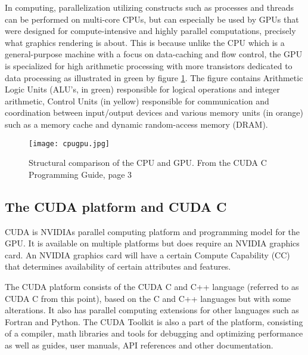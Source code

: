 In computing, parallelization utilizing constructs such as processes and threads can be performed on multi-core CPUs, but can especially be used by GPUs that were designed for compute-intensive and highly parallel computations, precisely what graphics rendering is about.
This is because unlike the CPU which is a general-purpose machine with a focus on data-caching and flow control, the GPU is specialized for high arithmetic processing with more transistors dedicated to data processing as illustrated in green by figure \ref{cpugpu}. 
The figure contains Arithmetic Logic Units (ALU's, in green) responsible for logical operations and integer arithmetic, Control Units (in yellow) responsible for communication and coordination between input/output devices and various memory units (in orange) such as a memory cache and dynamic random-access memory (DRAM).

\begin{figure}[h!]
\texttt{[image: cpugpu.jpg]}
\caption{Structural comparison of the CPU and GPU. From the CUDA C Programming Guide, page 3 \cite{nvidia2014programming}\label{cpugpu}}
\end{figure}

\subsection{The CUDA platform and CUDA C}\label{subsec:background:cudac}
CUDA is NVIDIAs parallel computing platform and programming model for the GPU.
It is available on multiple platforms but does require an NVIDIA graphics card. 
An NVIDIA graphics card will have a certain Compute Capability (CC) that determines availability of certain attributes and features.

The CUDA platform consists of the CUDA C and C++ language (referred to as CUDA C from this point), based on the C and C++ languages but with some alterations.
It also has parallel computing extensions for other languages such as Fortran and Python.
The CUDA Toolkit is also a part of the platform, consisting of a compiler, math libraries and tools for debugging and optimizing performance as well as guides, user manuals, API references and other documentation.

